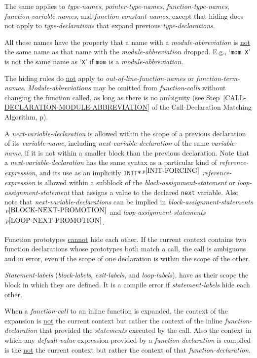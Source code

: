 \documentclass[12pt]{article}
\newcommand{\pagref}[1]{p\pageref{#1}}
\newcommand{\pagnote}[1]{$\,^{p\pageref{#1}}$}
\begin{document}
The same applies to {\em type-names}, {\em pointer-type-names},
{\em function-type-names}, {\em function-variable-names}, and
{\em function-constant-names}, except that hiding does not
apply to {\em type-declarations} that expand previous
{\em type-declarations}.

All these names have the property that a name with a {\em module-abbreviation}
is \underline{not} the same name as that name with the {\em module-abbreviation}
dropped.  E.g., `{\tt mom X}' is not the same name as `{\tt X}' if
{\tt mom} is a {\em module-abbreviation}.

The hiding rules do \underline{not}
apply to {\em out-of-line-function-names} or {\em function-term-names}.
{\em Module-abbreviations} may be omitted from {\em function-calls}
without changing the function called, as long as there is no
ambiguity (see Step~\ref{CALL-DECLARATION-MODULE-ABBREVIATION}
of the Call-Declaration Matching Algorithm,
\pagref{CALL-DECLARATION-MODULE-ABBREVIATION}).

A {\em next-variable-declaration} is allowed
within the scope of a previous declaration of its {\em variable-name},
including {\em next-variable-declaration} of the same {\em variable-name},
if it is not within a smaller block than the previous declaration.
Note that a {\em next-variable-declaration} has
the same syntax as a particular kind of {\em reference-expression}, and its use
as an implicitly {\tt *INIT*}\pagnote{INIT-FORCING} {\em reference-expression}
is allowed within a subblock of the {\em block-assignment-state\-ment}
or {\em loop-assignment-statement} that assigns a value to the
declared {\tt next} variable.
Also note that {\em next-variable-declarations} can be implied
in {\em block-assignment-statements}\pagnote{BLOCK-NEXT-PROMOTION}
and {\em loop-assignment-statements}\pagnote{LOOP-NEXT-PROMOTION}.

Function prototypes \underline{cannot} hide each other.  If the
current context contains two function declarations whose prototypes
both match a call, the call is ambiguous and in error,
even if the scope of one declaration is within
the scope of the other.

{\em Statement-labels} ({\em block-labels},
{\em exit-labels}, and {\em loop-labels}), have as their scope
the block in which they are defined.  It is a compile
error if {\em statement-labels} hide each other.

When a {\em function-call} to an inline function is expanded,
the context of the expansion is \underline{not} the current context but
rather the context of the inline {\em function-declaration}
that provided the {\em statements} executed by the call.
Also the context in which any {\em default-value} expression
provided by a {\em function-declaration} is compiled\label{DEFAULT-CONTEXT}
is the \underline{not} the current context but
rather the context of that {\em function-declaration}.
\end{document}

